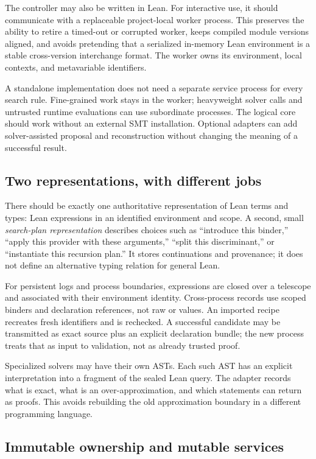 \documentclass[11pt,letterpaper]{article}
\newcommand{\id}[1]{\texttt{\detokenize{#1}}}
\theoremstyle{definition}
\theoremstyle{remark}
\begin{document}
The controller may also be written in Lean. For interactive use, it should communicate with a replaceable project-local worker process. This preserves the ability to retire a timed-out or corrupted worker, keeps compiled module versions aligned, and avoids pretending that a serialized in-memory Lean environment is a stable cross-version interchange format. The worker owns its environment, local contexts, and metavariable identifiers.

A standalone implementation does not need a separate service process for every search rule. Fine-grained work stays in the worker; heavyweight solver calls and untrusted runtime evaluations can use subordinate processes. The logical core should work without an external SMT installation. Optional adapters can add solver-assisted proposal and reconstruction without changing the meaning of a successful result.

\subsection{Two representations, with different jobs}

There should be exactly one authoritative representation of Lean terms and types: Lean expressions in an identified environment and scope. A second, small \emph{search-plan representation} describes choices such as ``introduce this binder,'' ``apply this provider with these arguments,'' ``split this discriminant,'' or ``instantiate this recursion plan.'' It stores continuations and provenance; it does not define an alternative typing relation for general Lean.

For persistent logs and process boundaries, expressions are closed over a telescope and associated with their environment identity. Cross-process records use scoped binders and declaration references, not raw \id{FVarId} or \id{MVarId} values. An imported recipe recreates fresh identifiers and is rechecked. A successful candidate may be transmitted as exact source plus an explicit declaration bundle; the new process treats that as input to validation, not as already trusted proof.

Specialized solvers may have their own ASTs. Each such AST has an explicit interpretation into a fragment of the sealed Lean query. The adapter records what is exact, what is an over-approximation, and which statements can return as proofs. This avoids rebuilding the old approximation boundary in a different programming language.

\subsection{Immutable ownership and mutable services}
\end{document}
